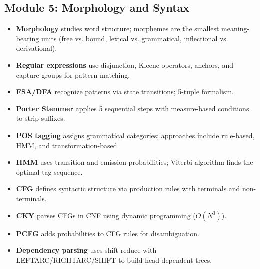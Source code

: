 \documentclass[11pt,a4paper]{article}
\begin{document}
\subsection{Module 5: Morphology and Syntax}
\begin{itemize}
    \item \textbf{Morphology} studies word structure; morphemes are the smallest meaning-bearing units (free vs. bound, lexical vs. grammatical, inflectional vs. derivational).
    \item \textbf{Regular expressions} use disjunction, Kleene operators, anchors, and capture groups for pattern matching.
    \item \textbf{FSA/DFA} recognize patterns via state transitions; 5-tuple formalism.
    \item \textbf{Porter Stemmer} applies 5 sequential steps with measure-based conditions to strip suffixes.
    \item \textbf{POS tagging} assigns grammatical categories; approaches include rule-based, HMM, and transformation-based.
    \item \textbf{HMM} uses transition and emission probabilities; Viterbi algorithm finds the optimal tag sequence.
    \item \textbf{CFG} defines syntactic structure via production rules with terminals and non-terminals.
    \item \textbf{CKY} parses CFGs in CNF using dynamic programming ($O(N^3)$).
    \item \textbf{PCFG} adds probabilities to CFG rules for disambiguation.
    \item \textbf{Dependency parsing} uses shift-reduce with LEFTARC/RIGHTARC/SHIFT to build head-dependent trees.
\end{itemize}
\end{document}
